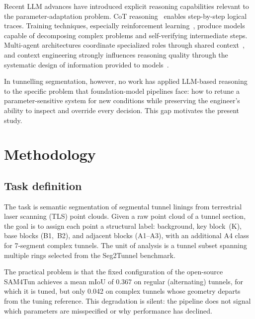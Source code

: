 \documentclass[a4paper,fleqn]{cas-dc}
\begin{document}
Recent LLM advances have introduced explicit reasoning capabilities relevant to the parameter-adaptation problem. CoT reasoning~\cite{wei2023cot} enables step-by-step logical traces. Training techniques, especially reinforcement learning~\cite{deepseek2025analysis, openai2025o3, xiang2025metacot}, produce models capable of decomposing complex problems and self-verifying intermediate steps. Multi-agent architectures coordinate specialized roles through shared context~\cite{hong2024metagpt, qian2024chatdev, chen2024comm}, and context engineering strongly influences reasoning quality through the systematic design of information provided to models~\cite{xu2024retrieval, mei2025survey}.

In tunnelling segmentation, however, no work has applied LLM-based reasoning to the specific problem that foundation-model pipelines face: how to retune a parameter-sensitive system for new conditions while preserving the engineer’s ability to inspect and override every decision. This gap motivates the present study.


\section{Methodology}\label{sec:methods}

\subsection{Task definition}\label{sec:problem-def}

The task is semantic segmentation of segmental tunnel linings from terrestrial laser scanning (TLS) point clouds. Given a raw point cloud of a tunnel section, the goal is to assign each point a structural label: background, key block~(K), base blocks (B1,~B2), and adjacent blocks (A1--A3), with an additional A4 class for 7-segment complex tunnels. The unit of analysis is a tunnel subset spanning multiple rings selected from the Seg2Tunnel benchmark. 

The practical problem is that the fixed configuration of the open-source SAM4Tun achieves a mean mIoU of 0.367 on regular (alternating) tunnels, for which it is tuned, but only 0.042 on complex tunnels whose geometry departs from the tuning reference. This degradation is silent: the pipeline does not signal which parameters are misspecified or why performance has declined.
\end{document}
